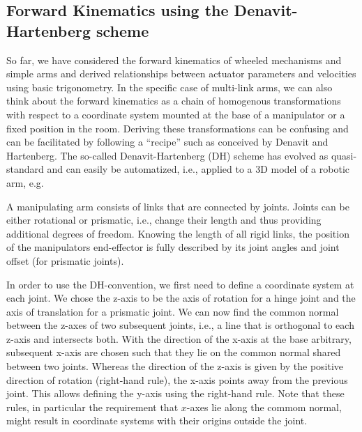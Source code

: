 \subsection{Forward Kinematics using the Denavit-Hartenberg scheme}
So far, we have considered the forward kinematics of wheeled mechanisms and simple arms and derived relationships between actuator parameters and velocities using basic trigonometry. In the specific case of multi-link arms, we can also think about the forward kinematics as a chain of homogenous transformations with respect to a coordinate system mounted at the base of a manipulator or a fixed position in the room. Deriving these transformations can be confusing and can be facilitated by following a ``recipe'' such as conceived by Denavit and Hartenberg. The so-called Denavit-Hartenberg (DH) scheme has evolved as quasi-standard and can easily be automatized, i.e., applied to a 3D model of a robotic arm, e.g.

A manipulating arm consists of links that are connected by joints. Joints can be either rotational or prismatic, i.e., change their length and thus providing additional degrees of freedom. Knowing the length of all rigid links, the position of the manipulators end-effector is fully described by its joint angles and joint offset (for prismatic joints).


In order to use the DH-convention, we first need to define a coordinate system at each joint. We chose the z-axis to be the axis of rotation for a hinge joint and the axis of translation for a prismatic joint. We can now find the common normal between the z-axes of two subsequent joints, i.e., a line that is orthogonal to each z-axis and intersects both. With the direction of the x-axis at the base arbitrary, subsequent x-axis are chosen such that they lie on the common normal shared between two joints. Whereas the direction of the z-axis is given by the positive direction of rotation (right-hand rule), the x-axis points away from the previous joint. This allows defining the y-axis using the right-hand rule. Note that these rules, in particular the requirement that $x$-axes lie along the commom normal, might result in coordinate systems with their origins outside the joint. %

